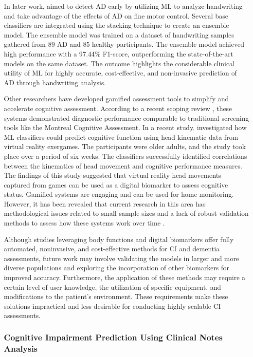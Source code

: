In later work,  aimed to detect AD early by utilizing ML to analyze handwriting and take advantage of the effects of AD on fine motor control. Several base classifiers are integrated using the stacking technique to create an ensemble model. The ensemble model was trained on a dataset of handwriting samples gathered from 89 AD and 85 healthy participants. The ensemble model achieved high performance with a 97.44\% F1-score, outperforming the state-of-the-art models on the same dataset. The outcome highlights the considerable clinical utility of ML for highly accurate, cost-effective, and non-invasive prediction of AD through handwriting analysis. 

Other researchers have developed gamified assessment tools to simplify and accelerate cognitive assessment. According to a recent scoping review \cite{Chen2025Video}, these systems demonstrated diagnostic performance comparable to traditional screening tools like the Montreal Cognitive Assessment. In a recent study,  investigated how ML classifiers could predict cognitive function using head kinematic data from virtual reality exergames. The participants were older adults, and the study took place over a period of six weeks. The classifiers successfully identified correlations between the kinematics of head movement and cognitive performance measures. The findings of this study suggested that virtual reality head movements captured from games can be used as a digital biomarker to assess cognitive status. Gamified systems are engaging and can be used for home monitoring. However, it has been revealed that current research in this area has methodological issues related to small sample sizes and a lack of robust validation methods to assess how these systems work over time \cite{Chen2025Video}.

Although studies leveraging body functions and digital biomarkers offer fully automated, noninvasive, and cost-effective methods for CI and dementia assessments, future work may involve validating the models in larger and more diverse populations and exploring the incorporation of other biomarkers for improved accuracy. Furthermore, the application of these methods may require a certain level of user knowledge, the utilization of specific equipment, and modifications to the patient's environment. These requirements make these solutions impractical and less desirable for conducting highly scalable CI assessments.

\subsubsection{Cognitive Impairment Prediction Using Clinical Notes Analysis}

